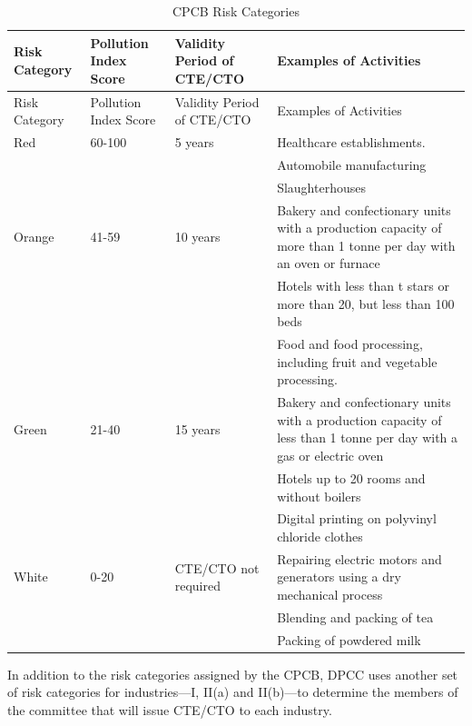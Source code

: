 \documentclass[a4paper, 12pt]{article}
\newcommand\tabitem{\makebox[1em][r]{\textbullet~}}
\begin{document}



\begin{longtable}{p{2cm}>{\raggedright}p{3.5cm}>{\raggedright}p{3.5cm}>{\raggedright\arraybackslash}p{6cm}}
\caption{CPCB Risk Categories} \\
Risk Category & Pollution Index Score & Validity Period of CTE/CTO & Examples of Activities \\
\midrule
\endfirsthead
Risk Category & Pollution Index Score & Validity Period of CTE/CTO & Examples of Activities \\
\midrule
\endhead
\endfoot
\endlastfoot

Red & 60-100 & 5 years & \tabitem Healthcare establishments. \\
 &  &  &   \tabitem Automobile manufacturing \\
  &  &  &  \tabitem Slaughterhouses \\
Orange & 41-59 & 10 years &  \tabitem Bakery and confectionary units with a production capacity of more than 1 tonne per day with an oven or furnace  \\
 &  &  & \tabitem Hotels with less than t stars or more than 20, but less than 100 beds \\
 &  &  & \tabitem Food and food processing, including fruit and vegetable processing.  \\
Green & 21-40 & 15 years & \tabitem Bakery and confectionary units with a production capacity of less than 1 tonne per day with a gas or electric oven \\
 &  &  &  \tabitem Hotels up to 20 rooms and without boilers \\
 &  &  & \tabitem Digital printing on polyvinyl chloride clothes \\
White & 0-20 & CTE/CTO not required & \tabitem Repairing electric motors and generators using a dry mechanical process \\
 &  &  & \tabitem Blending and packing of tea \\
 &  &  & \tabitem Packing of powdered milk \\

\end{longtable}

                                  
                 In addition to the risk categories assigned by the CPCB, DPCC uses another set of risk categories for industries—I, II(a) and II(b)—to determine the members of the committee that will issue CTE/CTO to each industry.\\
                 
\end{document}
